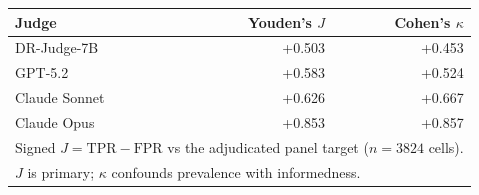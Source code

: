 \begin{tabular}{lrr}
\toprule
Judge & Youden's $J$ & Cohen's $\kappa$ \\
\midrule
DR-Judge-7B & +0.503 & +0.453 \\
GPT-5.2 & +0.583 & +0.524 \\
Claude Sonnet & +0.626 & +0.667 \\
Claude Opus & +0.853 & +0.857 \\
\bottomrule
\multicolumn{3}{l}{\footnotesize Signed $J=\mathrm{TPR}-\mathrm{FPR}$ vs the adjudicated panel target ($n=3824$ cells).} \\
\multicolumn{3}{l}{\footnotesize $J$ is primary; $\kappa$ confounds prevalence with informedness.} \\
\end{tabular}
